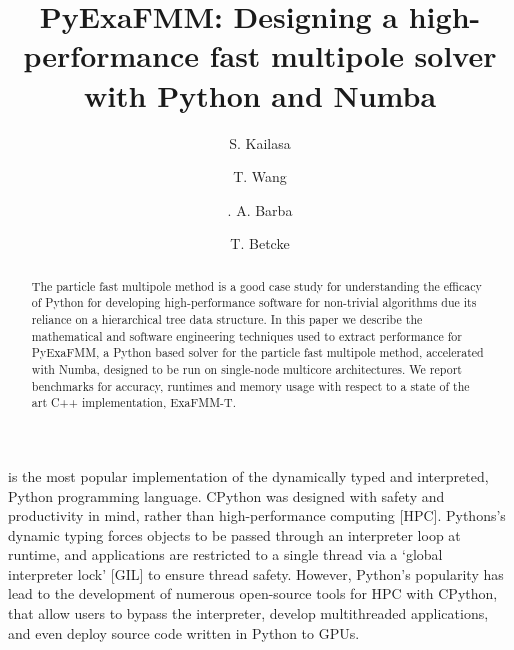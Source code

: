 \documentclass{IEEEcsmag}
\begin{document}

\title{PyExaFMM: Designing a high-performance fast multipole solver with Python and Numba}

\author{S. Kailasa}

\author{T. Wang}

\author{. A. Barba}

\author{T. Betcke}


\begin{abstract}
The particle fast multipole method is a good case study for understanding the efficacy of Python for developing high-performance software for non-trivial algorithms due its reliance on a hierarchical tree data structure. In this paper we describe the mathematical and software engineering techniques used to extract performance for PyExaFMM, a Python based solver for the particle fast multipole method, accelerated with Numba, designed to be run on single-node multicore architectures. We report benchmarks for accuracy, runtimes and memory usage with respect to a state of the art C++ implementation, ExaFMM-T.
\end{abstract}

\maketitle
{} is the most popular implementation of the dynamically typed and interpreted, Python programming language. CPython was designed with safety and productivity in mind, rather than high-performance computing [HPC]. Pythons's dynamic typing forces objects to be passed through an interpreter loop at runtime, and applications are restricted to a single thread via a `global interpreter lock' [GIL] to ensure thread safety. However, Python's popularity has lead to the development of numerous open-source tools for HPC with CPython, that allow users to bypass the interpreter, develop multithreaded applications, and even deploy source code written in Python to GPUs.
\end{document}
